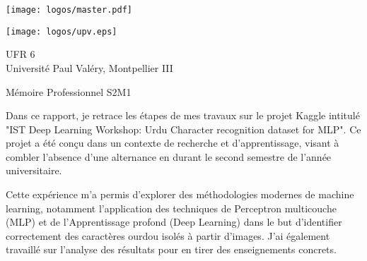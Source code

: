 \begin{minipage}{.4\textwidth}
\begin{center}
\texttt{[image: logos/master.pdf]}
\end{center}
\end{minipage}%
\hspace{2cm}
\begin{minipage}{.4\textwidth}
\begin{center}
\texttt{[image: logos/upv.eps]}
\end{center}
\end{minipage}%


\begin{center}
\vspace{1cm}
{\huge UFR 6}\\
Université Paul Valéry, Montpellier III\\
\vspace{1cm}

{\Large Mémoire Professionnel S2M1}
\end{center}
\noindent\makebox[\linewidth]{\rule{\paperwidth}{0.4pt}}
\vspace{-15em}
{\let\newpage\relax\maketitle}
\vspace{-10em}
\noindent\makebox[\linewidth]{\rule{\paperwidth}{0.4pt}}

\begin{minipage}{.45\textwidth}
\vspace{3em}
Dans ce rapport, je retrace les étapes de
mes travaux sur le projet Kaggle intitulé
"IST Deep Learning Workshop:
Urdu Character recognition dataset for MLP". Ce projet a été conçu dans un contexte
de recherche et d’apprentissage, visant
à combler l’absence d’une alternance en
durant le second semestre de l’année universitaire.

\end{minipage}%
\hspace{0.5cm}
\begin{minipage}{.45\textwidth}
\vspace{3em}
Cette expérience m’a permis d’explorer des méthodologies modernes de machine learning, notamment l’application des techniques de Perceptron multicouche (MLP) et de  l'Apprentissage profond (Deep Learning)
dans le but d'identifier correctement des caractères ourdou isolés à partir d'images. J’ai également travaillé sur l’analyse des résultats pour en tirer des enseignements
concrets.  
\end{minipage}
\newpage